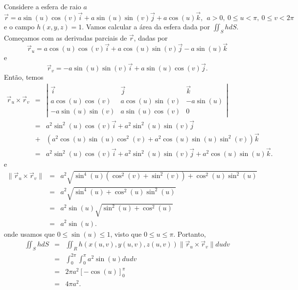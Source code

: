 \begin{ex}\label{ex_esfera_int_sup}Considere a esfera de raio $a$ 
$$
\vec{r}=a\sin(u)\cos(v)\vec{i}+a\sin(u)\sin(v)\vec{j}+a\cos(u)\vec{k},~~ a>0, ~ 0\leq u< \pi, ~ 0\leq v< 2\pi
$$
e o campo $h(x,y,z)=1$. Vamos calcular a área da esfera dada por $\iint_S h d S $. Começamos com as derivadas parciais de $\vec{r}$, dadas por
$$
\vec{r}_u=a\cos(u)\cos(v)\vec{i}+a\cos(u)\sin(v)\vec{j}-a\sin(u)\vec{k}
$$
e
$$
\vec{r}_v=-a\sin(u)\sin(v)\vec{i}+a\sin(u)\cos(v)\vec{j}.
$$
Então, temos
\begin{eqnarray}
\label{prod_vet_ru_rv}  \vec{r}_u\times\vec{r}_v&=&\left|
 \begin{array}{ccc}
 \vec{i} & \vec{j} & \vec{k} \\
  a\cos(u)\cos(v)&a\cos(u)\sin(v)&-a\sin(u) \\
-a\sin(u)\sin(v)&a\sin(u)\cos(v)&0
 \end{array}
\right|\\
\nonumber &=& a^2\sin^2(u)\cos(v)\vec{i}+ a^2\sin^2(u)\sin(v)\vec{j}\\\nonumber&+&(a^2\cos(u)\sin(u)\cos^2(v)+ a^2\cos(u)\sin(u)\sin^2(v))\vec{k}\\
\nonumber &=& a^2\sin^2(u)\cos(v)\vec{i}+ a^2\sin^2(u)\sin(v)\vec{j}+a^2\cos(u)\sin(u)\vec{k}.
\end{eqnarray}
e
\begin{eqnarray*}
\|  \vec{r}_u\times\vec{r}_v\|&=&a^2\sqrt{ \sin^4(u)(\cos^2(v)+ \sin^2(v))+\cos^2(u)\sin^2(u)}\\
&=&a^2\sqrt{ \sin^4(u)+\cos^2(u)\sin^2(u)}\\
&=&a^2\sin(u)\sqrt{ \sin^2(u)+\cos^2(u)}\\
&=&a^2\sin(u).
\end{eqnarray*}
onde usamos que $0\leq \sin(u)\leq 1$, visto que $0\leq u\leq \pi$. Portanto,
\begin{eqnarray*}
\iint_S h d S &=& \iint_R h(x(u,v),y(u,v),z(u,v)) \|\vec{r}_u\times \vec{r}_v\|d udv \\
&=& \int_0^{2\pi}\int_0^{\pi} a^2\sin(u) d udv \\
&=&2\pi a^2 \left[ -\cos(u) \right]_0^{\pi}\\
&=&4\pi a^2.
\end{eqnarray*}

\end{ex}
